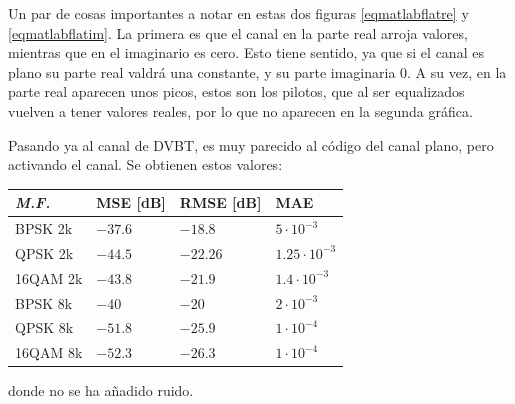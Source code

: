 \documentclass[11pt]{scrartcl} %
\begin{document}
\begin{preview}
Un par de cosas importantes a notar en estas dos figuras \ref{eqmatlabflatre} y \ref{eqmatlabflatim}. La primera es que el canal en la parte real arroja valores, mientras que en el imaginario es cero. Esto tiene sentido, ya que si el canal es plano su parte real valdrá una constante, y su parte imaginaria 0. A su vez, en la parte real aparecen unos picos, estos son los pilotos, que al ser equalizados vuelven a tener valores reales, por lo que no aparecen en la segunda gráfica.

Pasando ya al canal de DVBT, es muy parecido al código del canal plano, pero activando el canal. Se obtienen estos valores:

\vspace{5mm} 
\begin{minipage}{\linewidth}
	\begin{center}
	\centering %
		\begin{tabular}{l l l l}
		\toprule
		\textit{M.F.} & \textbf{MSE [dB]} & \textbf{RMSE [dB]} & \textbf{MAE}\\
		\midrule
		BPSK 2k & $-37.6$ &  $-18.8$ & $5 \cdot 10^{-3}$ \\
		QPSK 2k& $-44.5$ &  $-22.26$ & $1.25 \cdot 10^{-3}$ \\
		16QAM 2k& $-43.8$ &  $-21.9$ & $1.4 \cdot 10^{-3}$ \\
		BPSK 8k & $-40$ &  $-20$ & $2 \cdot 10^{-3}$ \\
		QPSK 8k & $-51.8$ &  $-25.9$ & $1 \cdot 10^{-4}$ \\
		16QAM 8k& $-52.3$ &  $-26.3$ & $1\cdot 10^{-4}$ \\
		\bottomrule
	\end{tabular}
	\end{center}
	\label{tablamatlab}
\end{minipage}

donde no se ha añadido ruido.


\end{preview}
\end{document}
